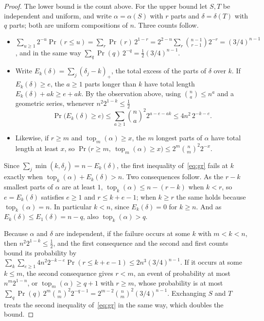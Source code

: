 \documentclass[12pt]{article}
\numberwithin{theorem}{section}
\numberwithin{equation}{section}
\begin{document}
\begin{proof}
The lower bound is the count above. For the upper bound let $S,T$ be independent and uniform, and write
$\alpha=\alpha(S)$ with $r$ parts and $\delta=\delta(T)$ with $q$ parts; both are uniform compositions of $n$.
Three counts follow.
\begin{itemize}
\item $\sum_{u\ge1}2^{-u}\Pr(r\le u)=\sum_r\Pr(r)\,2^{1-r}=2^{2-n}\sum_r\binom{n-1}{r-1}2^{-r}=(3/4)^{n-1}$, and in
the same way $\sum_q\Pr(q)\,2^{-q}=\tfrac12(3/4)^{n-1}$.
\item Write $E_k(\delta)=\sum_j(\delta_j-k)_+$, the total excess of the parts of $\delta$ over $k$. If
$E_k(\delta)\ge e$, the $a\ge1$ parts longer than $k$ have total length $E_k(\delta)+ak\ge e+ak$. By the
observation above, using $\binom na\le n^a$ and a geometric series, whenever $n^2 2^{1-k}\le\tfrac12$
\[
\Pr\bigl(E_k(\delta)\ge e\bigr)\le\sum_{a\ge1}\binom na^2 2^{a-e-ak}\le 4n^2\,2^{-k-e}.
\]
\item Likewise, if $r\ge m$ and $\operatorname{top}_m(\alpha)\ge x$, the $m$ longest parts of $\alpha$ have total
length at least $x$, so $\Pr\bigl(r\ge m,\ \operatorname{top}_m(\alpha)\ge x\bigr)\le2^m\binom nm^2 2^{-x}$.
\end{itemize}
Since $\sum_j\min(k,\delta_j)=n-E_k(\delta)$, the first inequality of~\eqref{eq:gr} fails at $k$ exactly when
$\operatorname{top}_k(\alpha)+E_k(\delta)>n$. Two consequences follow. As the $r-k$ smallest parts of $\alpha$ are
at least $1$, $\operatorname{top}_k(\alpha)\le n-(r-k)$ when $k<r$, so $e=E_k(\delta)$ satisfies $e\ge1$ and
$r\le k+e-1$; when $k\ge r$ the same holds because $\operatorname{top}_k(\alpha)=n$. In particular $k<n$, since
$E_k(\delta)=0$ for $k\ge n$. And as $E_k(\delta)\le E_1(\delta)=n-q$, also $\operatorname{top}_k(\alpha)>q$.

Because $\alpha$ and $\delta$ are independent, if the failure occurs at some $k$ with $m<k<n$, then $n^2
2^{1-k}\le\tfrac12$, and the first consequence and the second and first counts bound its probability by
$\sum_{k}\sum_{e\ge1}4n^2 2^{-k-e}\Pr(r\le k+e-1)\le 2n^3(3/4)^{n-1}$. If it occurs at some $k\le m$, the second
consequence gives $r<m$, an event of probability at most $n^m2^{1-n}$, or $\operatorname{top}_m(\alpha)\ge q+1$
with $r\ge m$, whose probability is at most $\sum_q\Pr(q)\,2^{m}\binom nm^2 2^{-q-1}=2^{m-2}\binom nm^2(3/4)^{n-1}$.
Exchanging $S$ and $T$ treats the second inequality of~\eqref{eq:gr} in the same way, which doubles the bound.
\end{proof}
\end{document}
